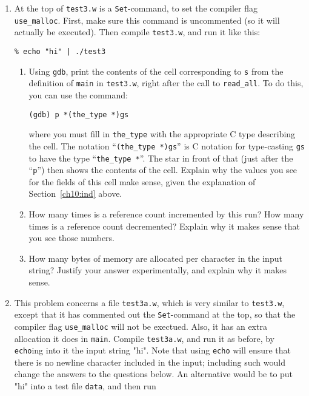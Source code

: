 \documentclass{book}[12pt]
\begin{document}
\begin{enumerate}

\item At the top of \texttt{test3.w} is a \texttt{Set}-command, to set
the compiler flag \texttt{use\_malloc}.  First, make sure this command is
uncommented (so it will actually be executed).  Then compile \texttt{test3.w},
and run it like this:

\begin{verbatim}
% echo "hi" | ./test3
\end{verbatim}

\begin{enumerate}

\item Using \texttt{gdb}, print the contents of the cell corresponding
to \texttt{s} from the definition of \texttt{main} in
\texttt{test3.w}, right after the call to \texttt{read\_all}.  To do this,
you can use the command:

\begin{verbatim}
(gdb) p *(the_type *)gs
\end{verbatim}

\noindent where you must fill in \texttt{the\_type} with the
appropriate C type describing the cell.  The notation
``\texttt{(the\_type *)gs}'' is C notation for type-casting
\texttt{gs} to have the type ``\texttt{the\_type *}''.  The star in
front of that (just after the ``\texttt{p}'') then shows the contents
of the cell.  Explain why the values you see for the fields of this
cell make sense, given the explanation of Section~\ref{ch10:ind}
above.

\item How many times is a reference count incremented by this run?
How many times is a reference count decremented?  Explain why it makes
sense that you see those numbers.

\item How many bytes of memory are allocated per character in the input string?  Justify
your answer experimentally, and explain why it makes sense.

\end{enumerate}

\item This problem concerns a file \texttt{test3a.w}, which is very
similar to \texttt{test3.w}, except that it has commented out the
\texttt{Set}-command at the top, so that the compiler flag
\texttt{use\_malloc} will not be exectued.  Also, it has an extra
allocation it does in \texttt{main}.  Compile \texttt{test3a.w}, and
run it as before, by \texttt{echo}ing into it the input string "hi".
Note that using \texttt{echo} will ensure that there is no newline
character included in the input; including such would change the
answers to the questions below.  An alternative would be to put "hi"
into a test file \texttt{data}, and then run


\end{enumerate}
\end{document}
